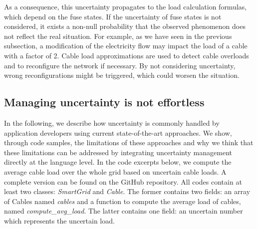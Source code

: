 As a consequence, this uncertainty propagates to the load calculation formulas, which depend on the fuse states.
If the uncertainty of fuse states is not considered, it exists a non-null probability that the observed phenomenon does not reflect the real situation.
For example, as we have seen in the previous subsection, a modification of the electricity flow may impact the load of a cable with a factor of 2.
Cable load approximations are used to detect cable overloads and to reconfigure the network if necessary.
By not considering uncertainty, wrong reconfigurations might be triggered, which could worsen the situation.

\subsection{Managing uncertainty is not effortless}
In the following, we describe how uncertainty is commonly handled by application developers using current state-of-the-art approaches. 
We show, through code samples, the limitations of these approaches and why we think that these limitations can be addressed by integrating uncertainty management directly at the language level.
In the code excerpts below, we compute the average cable load over the whole grid based on uncertain cable loads. 
A complete version can be found on the GitHub repository. 
All codes contain at least two classes: \textit{SmartGrid} and \textit{Cable}.
The former contains two fields: an array of Cables named \textit{cables} and a function to compute the average load of cables, named \textit{compute\_avg\_load}.
The latter contains one field: an uncertain number which represents the uncertain load.

